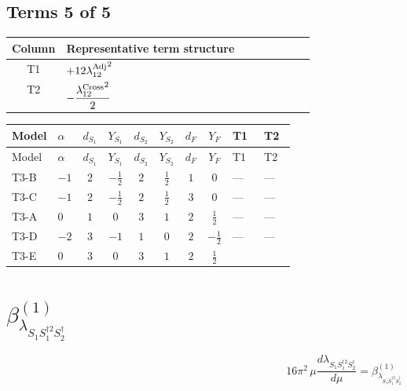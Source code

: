 \documentclass[8pt]{article}
\begin{document}
\begin{landscape}
\subsection*{Terms 5 of 5}
\begin{center}
\begin{tabular}{@{}c >{\raggedright\arraybackslash}p{0.82\linewidth}@{}}
\toprule
Column & Representative term structure \\
\midrule
T1 & \(\displaystyle +12 {\lambda_{12}^{\rm Adj}}^2\) \\
\midrule
T2 & \(\displaystyle -\frac{{\lambda_{12}^{\rm Cross}}^2}{2}\) \\
\midrule
\bottomrule
\end{tabular}
\end{center}
\smallskip
\tiny
\begin{longtable}{@{}llcccccc >{\raggedright\arraybackslash}p{0.21\linewidth} >{\raggedright\arraybackslash}p{0.21\linewidth}@{}}
\toprule
Model & $\alpha$ & $d_{S_1}$ & $Y_{S_1}$ & $d_{S_2}$ & $Y_{S_2}$ & $d_F$ & $Y_F$ & T1 & T2 \\
\midrule
\endfirsthead
\toprule
Model & $\alpha$ & $d_{S_1}$ & $Y_{S_1}$ & $d_{S_2}$ & $Y_{S_2}$ & $d_F$ & $Y_F$ & T1 & T2 \\
\midrule
\endhead
T3-B & $-1$ & $2$ & $-\frac{1}{2}$ & $2$ & $\frac{1}{2}$ & $1$ & $0$ & --- & --- \\
\midrule
T3-C & $-1$ & $2$ & $-\frac{1}{2}$ & $2$ & $\frac{1}{2}$ & $3$ & $0$ & --- & --- \\
\midrule
T3-A & $0$ & $1$ & $0$ & $3$ & $1$ & $2$ & $\frac{1}{2}$ & --- & --- \\
\midrule
T3-D & $-2$ & $3$ & $-1$ & $1$ & $0$ & $2$ & $-\frac{1}{2}$ & --- & --- \\
\midrule
T3-E & $0$ & $3$ & $0$ & $3$ & $1$ & $2$ & $\frac{1}{2}$ & \scriptsize\adjustbox{max width=\linewidth}{$\begin{gathered} +12 {\lambda_{12}^{\rm Adj}}^2\end{gathered}$} & \scriptsize\adjustbox{max width=\linewidth}{$\begin{gathered} -\frac{{\lambda_{12}^{\rm Cross}}^2}{2}\end{gathered}$} \\
\midrule
\bottomrule
\end{longtable}
\clearpage
\section*{$\beta_{\lambda_{S_1 S_1^{\dagger 2}S_2^\dagger}}^{(1)}$}
\[16\pi^2\,\mu\frac{d \lambda_{S_1 S_1^{\dagger 2}S_2^\dagger}}{d\mu}=\beta_{\lambda_{S_1 S_1^{\dagger 2}S_2^\dagger}}^{(1)}\]

\end{landscape}
\end{document}
